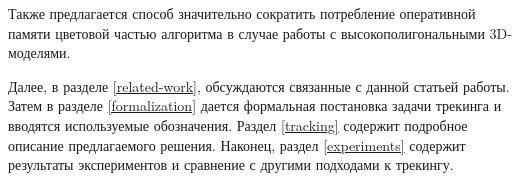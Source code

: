 Также предлагается способ значительно сократить потребление оперативной памяти
цветовой частью алгоритма в случае работы с высокополигональными 3D-моделями.

Далее, в разделе \ref{related-work}, обсуждаются связанные с данной статьей
работы.
Затем в разделе \ref{formalization} дается формальная постановка задачи
трекинга и вводятся используемые обозначения.
Раздел \ref{tracking} содержит подробное описание предлагаемого решения.
Наконец, раздел \ref{experiments} содержит результаты экспериментов и сравнение
с другими подходами к трекингу.
